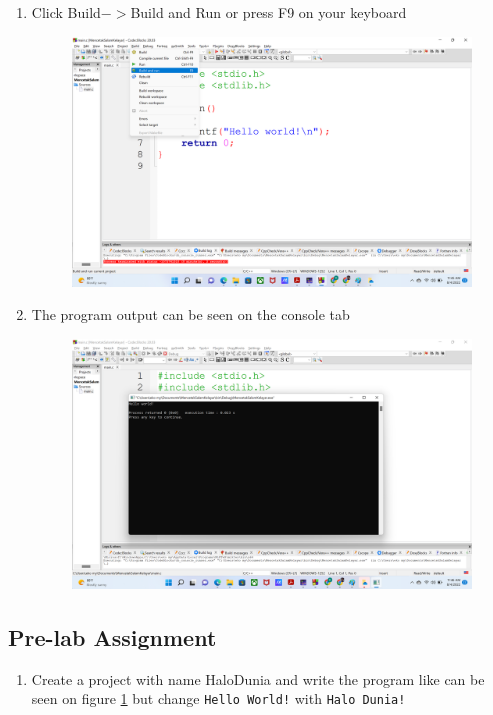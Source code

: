 \begin{enumerate}
\begin{figure}[H]
		      \caption{}
		      \label{fig:screenshot008}
	      \end{figure}
	\item Click Build$->$Build and Run or press F9 on your keyboard
	      \begin{figure}[H]
		      \centering
		      \includegraphics[width=0.7\linewidth]{P1/img/screenshot009.png}
		      \caption{}
		      \label{fig:screenshot009}
	      \end{figure}
	\item The program output can be seen on the console tab
	      \begin{figure}[H]
		      \centering
		      \includegraphics[width=0.7\linewidth]{P1/img/screenshot010.png}
		      \caption{}
		      \label{fig:screenshot010}
	      \end{figure}
\end{enumerate}

\subsection{Pre-lab Assignment}
\begin{enumerate}
	\item Create a project with name HaloDunia and write the program like can be seen on figure \ref{fig:screenshot008} but change \verb|Hello World!| with \verb|Halo Dunia!|
\end{enumerate}


